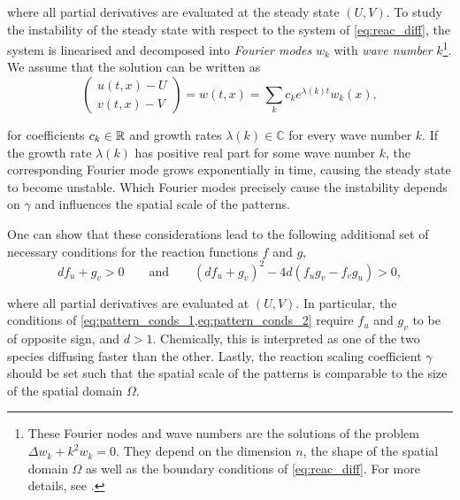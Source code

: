 \noindent
where all partial derivatives are evaluated at the steady state $(U, V)$. To study the instability of the steady state with respect to the system of \cref{eq:reac_diff}, the system is linearised and decomposed into \emph{Fourier modes} $w_k$ with \emph{wave number} $k$\footnote{These Fourier nodes and wave numbers are the solutions of the problem $\Delta w_k + k^2 w_k = 0$. They depend on the dimension $n$, the shape of the spatial domain $\Omega$ as well as the boundary conditions of \cref{eq:reac_diff}. For more details, see \cite{murray03}.}. We assume that the solution can be written as
%
\begin{equation*}
    \begin{pmatrix}u(t, x) - U \\ v(t, x) - V \end{pmatrix} = w(t, x) = \sum_{k} c_k e^{\lambda(k)t} w_k(x) ,
\end{equation*}

\noindent
for coefficients $c_k \in \mathbb{R}$ and growth rates $\lambda(k) \in \mathbb{C}$ for every wave number $k$. If the growth rate $\lambda(k)$ has positive real part for some wave number $k$, the corresponding Fourier mode grows exponentially in time, causing the steady state to become unstable. Which Fourier modes precisely cause the instability depends on $\gamma$ and influences the spatial scale of the patterns.

One can show that these considerations lead to the following additional set of necessary conditions for the reaction functions $f$ and $g$,
%
\begin{equation}
    \label{eq:pattern_conds_2}
    d f_u + g_v > 0 \qquad \text{and} \qquad \left(d f_u + g_v\right)^2 - 4d \left(f_u g_v - f_v g_u\right) > 0,
\end{equation}

\noindent
where all partial derivatives are evaluated at $(U, V)$. In particular, the conditions of \cref{eq:pattern_conds_1,eq:pattern_conds_2} require $f_u$ and $g_v$ to be of opposite sign, and $d > 1$. Chemically, this is interpreted as one of the two species diffusing faster than the other. Lastly, the reaction scaling coefficient $\gamma$ should be set such that the spatial scale of the patterns is comparable to the size of the spatial domain $\Omega$.